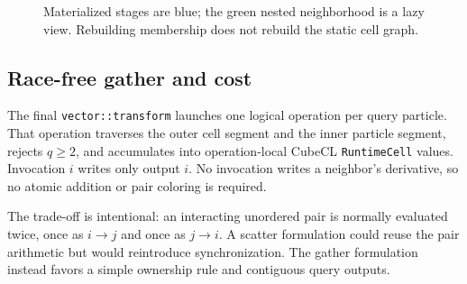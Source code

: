 \documentclass[a4paper,10pt]{article}
\newcommand{\code}[1]{\texttt{#1}}
\begin{document}
\begin{figure}[H]
  \centering
  \caption{Materialized stages are blue; the green nested neighborhood is a
  lazy view.  Rebuilding membership does not rebuild the static cell graph.}
  \label{fig:neighborhood}
\end{figure}

\subsection{Race-free gather and cost}

The final \code{vector::transform} launches one logical operation per query
particle.  That operation traverses the outer cell segment and the inner
particle segment, rejects $q\ge2$, and accumulates into operation-local CubeCL
\code{RuntimeCell} values.  Invocation $i$ writes only output $i$.  No invocation
writes a neighbor's derivative, so no atomic addition or pair coloring is
required.

The trade-off is intentional: an interacting unordered pair is normally
evaluated twice, once as $i\mathbin{\to}j$ and once as
$j\mathbin{\to}i$.  A scatter formulation could reuse the pair arithmetic but
would reintroduce synchronization.  The gather formulation instead favors a
simple ownership rule and contiguous query outputs.
\end{document}
